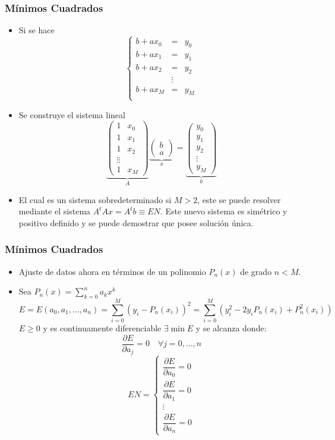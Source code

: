 \documentclass[10pt]{beamer}
\begin{document}
{
\frametitle{M\'inimos Cuadrados}
\begin{itemize}
\item<1-> Si se hace
$$
\left\{\begin{array}{lcl}
        b+ax_0 & = & y_0\\
        b+ax_1 & = & y_1\\
        b+ax_2 & = & y_2\\
        & \vdots &\\
        b+ax_M & = & y_M\\
       \end{array}
\right.
$$
\item<2->Se construye el sistema lineal
$$
\underbrace{\left(\begin{array}{cc}
       1 & x_0\\
       1 & x_1\\
       1 & x_2\\
       \vdots\vdots\\
       1 & x_M
      \end{array}
\right)}_{A}\underbrace{\left(\begin{array}{c}
              b\\
              a
             \end{array}
\right)}_{x} = \underbrace{\left(\begin{array}{c}
                 y_0\\
                 y_1\\
                 y_2\\
                 \vdots\\
                 y_M
                \end{array}
\right)}_{b}
$$

\item<3-> El cual es un sistema sobredeterminado si $M>2$, este se puede resolver mediante el sistema $A^tAx=A^tb \equiv EN$. Este nuevo
sistema es sim\'etrico y positivo definido y se puede demostrar que posee soluci\'on \'unica.
\end{itemize}
}
\frame
{
\frametitle{M\'inimos Cuadrados}
\begin{itemize}
  \item Ajuste de datos ahora en t\'erminos de un polinomio $P_n(x)$ de grado $n<M$.
  \item<2-> Sea $P_n(x) = \sum_{k=0}^na_kx^k$
  $$
  E=E(a_0,a_1,\ldots,a_n) = \sum_{i=0}^M(y_i - P_n(x_i))^2 = \sum_{i=0}^M(y_i^2 -2y_iP_n(x_i)+P_n^2(x_i))
  $$
  $E\geq 0$ y es continuamente diferenciable $\exists \min E$ y se alcanza donde:
  $$
  \dfrac{\partial E}{\partial a_j} = 0 \quad \forall j=0,\ldots,n
  $$
  $$
EN = \left\{\begin{array}{l}
             \dfrac{\partial E}{\partial a_0} = 0\\[10pt]
             \dfrac{\partial E}{\partial a_1} = 0\\
             \vdots\\
             \dfrac{\partial E}{\partial a_n} = 0
            \end{array}\right.
$$
\end{itemize}
}
\end{document}
